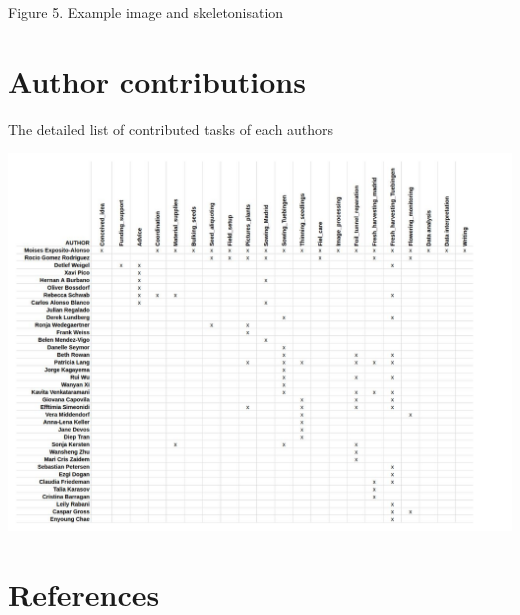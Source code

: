 \documentclass[]{article}
\begin{document}
Figure 5. Example image and skeletonisation

\section{Author contributions}\label{author-contributions}

The detailed list of contributed tasks of each authors

\centerline{\includegraphics[width=7in]{../figs/Figure_people_contribution.pdf.png}}

\section{References}\label{references}
\end{document}
